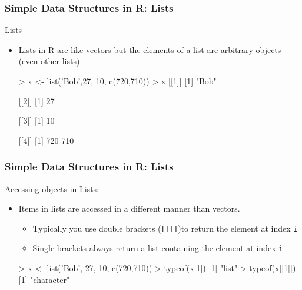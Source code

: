 \documentclass{beamer}
\begin{document}
\begin{frame}[fragile]
  \frametitle{Simple Data Structures in R: Lists}

\Large{Lists}

\begin{itemize}

\item Lists in R are like vectors but the elements of a list are arbitrary objects (even other lists)

\begin{Rcode}
> x <- list('Bob',27, 10, c(720,710))
> x
[[1]]
[1] "Bob"

[[2]]
[1] 27

[[3]]
[1] 10

[[4]]
[1] 720 710
\end{Rcode}

\end{itemize}

\end{frame}

\begin{frame}[fragile]
  \frametitle{Simple Data Structures in R: Lists}

Accessing objects in Lists:

\begin{itemize}

\item Items in lists are accessed in a  different manner than vectors.

\begin{itemize}
\item Typically you use double brackets (\texttt{[[]]})to return the element at index \texttt{i}

\item Single brackets always return a list containing the element at index \texttt{i}

\end{itemize}

\begin{Rcode}
> x <- list('Bob', 27, 10, c(720,710))
> typeof(x[1])
[1] "list"
> typeof(x[[1]])
[1] "character"
\end{Rcode}

\end{itemize}

\end{frame}
\end{document}
